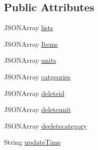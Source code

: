\subsection*{Public Attributes}
\begin{DoxyCompactItemize}
\item 
J\+S\+O\+N\+Array \hyperlink{classcom_1_1example_1_1santh_1_1shoppinglist_1_1_static_data_a2e553853981a2db0df178ecaa73b3a6a}{lists}
\item 
J\+S\+O\+N\+Array \hyperlink{classcom_1_1example_1_1santh_1_1shoppinglist_1_1_static_data_a8396eedfbdf79abf82f0081dc135af42}{Items}
\item 
J\+S\+O\+N\+Array \hyperlink{classcom_1_1example_1_1santh_1_1shoppinglist_1_1_static_data_a44bfa240d7ced9aa65e395d1f37e32c0}{units}
\item 
J\+S\+O\+N\+Array \hyperlink{classcom_1_1example_1_1santh_1_1shoppinglist_1_1_static_data_af1a56c4d85d465ddfbd3ffcd5d3c35a6}{catgeories}
\item 
J\+S\+O\+N\+Array \hyperlink{classcom_1_1example_1_1santh_1_1shoppinglist_1_1_static_data_a1d8214e43fc91fea8431ea2caea3b64f}{deleteid}
\item 
J\+S\+O\+N\+Array \hyperlink{classcom_1_1example_1_1santh_1_1shoppinglist_1_1_static_data_ad458aa6dd2d751e4cb6e393332cf753d}{deleteunit}
\item 
J\+S\+O\+N\+Array \hyperlink{classcom_1_1example_1_1santh_1_1shoppinglist_1_1_static_data_aaa46e350a44590604f7ef9057e1b6e55}{deeletecategory}
\item 
String \hyperlink{classcom_1_1example_1_1santh_1_1shoppinglist_1_1_static_data_ab79e46d3d064f42471fa34c85f69e81b}{update\+Time}
\end{DoxyCompactItemize}

